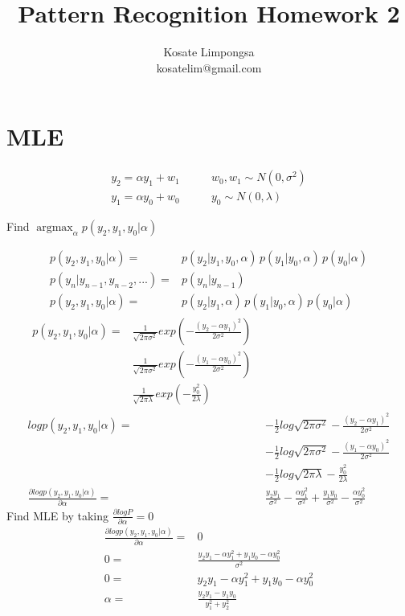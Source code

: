 \documentclass[12pt]{article}
\title{Pattern Recognition Homework 2}
\author{Kosate Limpongsa \\ kosatelim@gmail.com}
\begin{document}
\maketitle

\section{MLE}

\begin{align*}
  y_2 = \alpha y_1 + w_1 &\qquad w_0, w_1 \sim N(0, \sigma^2) \\
  y_1 = \alpha y_0 + w_0 &\qquad y_0 \sim N(0, \lambda)
\end{align*}
\begin{center}
Find $\operatorname*{argmax}_\alpha p(y_2,y_1,y_0|\alpha)$
\end{center}
\begin{align*}
p(y_2,y_1,y_0|\alpha) ={} & p(y_2|y_1,y_0,\alpha) \, p(y_1|y_0, \alpha) \, p(y_0|\alpha) \\
p(y_n|y_{n-1}, y_{n-2}, ...) ={} & p(y_n|y_{n-1}) \\
p(y_2,y_1,y_0|\alpha) ={} & p(y_2|y_1, \alpha) \, p(y_1|y_0, \alpha) \, p(y_0|\alpha)
\end{align*}
\begin{align*}
\begin{split}
p(y_2,y_1,y_0|\alpha) ={} 
  & \frac{1}{\sqrt{2\pi\sigma^2}}exp(-\frac{(y_2-\alpha y_1)^2}{2 \sigma^2}) \\
  & \frac{1}{\sqrt{2\pi\sigma^2}}exp(-\frac{(y_1-\alpha y_0)^2}{2 \sigma^2}) \\
  & \frac{1}{\sqrt{2\pi\lambda}}exp(-\frac{y_0^2}{2 \lambda})
\end{split}
\\
log p(y_2,y_1,y_0|\alpha) ={} 
  & -\frac{1}{2}log\sqrt{2\pi\sigma^2} - \frac{(y_2-\alpha y_1)^2}{2 \sigma^2} \\
  & -\frac{1}{2}log\sqrt{2\pi\sigma^2} - \frac{(y_1-\alpha y_0)^2}{2 \sigma^2} \\
  & -\frac{1}{2}log\sqrt{2\pi\lambda} - \frac{y_0^2}{2 \lambda}
\\
\frac{\partial log p(y_2,y_1,y_0|\alpha)}{\partial \alpha} ={}
  & \frac{y_2 y_1}{\sigma^2} - \frac{\alpha y_1^2}{\sigma^2} +
  \frac{y_1 y_0}{\sigma^2} - \frac{\alpha y_0^2}{\sigma^2}
\end{align*}
Find MLE by taking $\frac{\partial log P}{\partial \alpha} = 0$
\begin{align*}
  \frac{\partial log p(y_2,y_1,y_0|\alpha)}{\partial \alpha} ={} & 0\\
  0 ={} & \frac{y_2 y_1 - \alpha y_1^2 + y_1 y_0 - \alpha y_0^2}{\sigma^2} \\
  0 ={} & y_2 y_1 - \alpha y_1^2 + y_1 y_0 - \alpha y_0^2 \\
  \alpha ={} & \frac{y_2 y_1 - y_1 y_0}{y_1^2 + y_2^2}
\end{align*}
\end{document}

